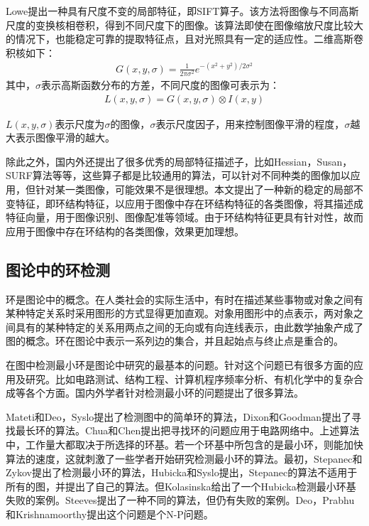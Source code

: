 Lowe提出一种具有尺度不变的局部特征，即SIFT算子\cite{lowe}。该方法将图像与不同高斯尺度的变换核相卷积，得到不同尺度下的图像。该算法即使在图像缩放尺度比较大的情况下，也能稳定可靠的提取特征点，且对光照具有一定的适应性。二维高斯卷积核如下：
\begin{align}
G(x, y, \sigma) = \frac{1}{2\pi\sigma^2}e^{-(x^2+y^2)/2\sigma^2}
\end{align}
其中，$\sigma$表示高斯函数分布的方差，不同尺度的图像可表示为：
\begin{align}
L(x, y, \sigma) = G(x, y, \sigma) \otimes I(x, y)
\end{align}

$L(x, y, \sigma)$表示尺度为$\sigma$的图像，$\sigma$表示尺度因子，用来控制图像平滑的程度，$\sigma$越大表示图像平滑的越大。

除此之外，国内外还提出了很多优秀的局部特征描述子，比如Hessian，Susan\cite{smith}，SURF\cite{bay}算法等等，这些算子都是比较通用的算法，可以针对不同种类的图像加以应用，但针对某一类图像，可能效果不是很理想。本文提出了一种新的稳定的局部不变特征，即环结构特征，以应用于图像中存在环结构特征的各类图像，将其描述成特征向量，用于图像识别、图像配准等领域。由于环结构特征更具有针对性，故而应用于图像中存在环结构的各类图像，效果更加理想。

\subsection{图论中的环检测}
\label{sec:complicatedtable}

环是图论中的概念。在人类社会的实际生活中，有时在描述某些事物或对象之间有某种特定关系时采用图形的方式显得更加直观。对象用图形中的点表示，两对象之间具有的某种特定的关系用两点之间的无向或有向连线表示，由此数学抽象产成了图的概念\cite{xujunming}。环在图论中表示一系列边的集合，并且起始点与终止点是重合的。

在图中检测最小环是图论中研究的最基本的问题。针对这个问题已有很多方面的应用及研究。比如电路测试、结构工程、计算机程序频率分析、有机化学中的复杂合成等各个方面。国内外学者针对检测最小环的问题提出了很多算法。

Mateti和Deo\cite{mateti}，Syslo\cite{syslo}提出了检测图中的简单环的算法，Dixon和Goodman\cite{goodman}提出了寻找最长环的算法。Chua和Chen提出把寻找环的问题应用于电路网络中\cite{chua}。上述算法中，工作量大都取决于所选择的环基。若一个环基中所包含的是最小环，则能加快算法的速度，这就刺激了一些学者开始研究检测最小环的算法。最初，Stepanec和Zykov提出了检测最小环的算法\cite{stepanec}，Hubicka和Syslo\cite{hubicka}提出，Stepanec的算法不适用于所有的图，并提出了自己的算法。但Kolasinska\cite{kola}给出了一个Hubicka检测最小环基失败的案例。Steeves提出了一种不同的算法，但仍有失败的案例。Deo，Prabhu和Krishnamoorthy\cite{deo}提出这个问题是个N-P问题。

